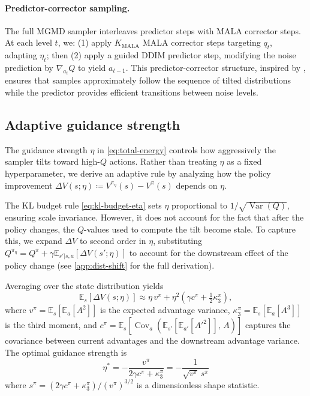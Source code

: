 \documentclass{article}
\theoremstyle{plain}
\theoremstyle{definition}
\theoremstyle{remark}
\newcommand{\E}{\mathbb{E}}
\DeclareMathOperator{\Var}{Var}
\DeclareMathOperator{\Cov}{Cov}
\begin{document}
\paragraph{Predictor-corrector sampling.}
The full MGMD sampler interleaves predictor steps with MALA corrector steps.
At each level $t$, we: (1) apply $K_{\text{MALA}}$ MALA corrector steps targeting $q_t$, adapting $\eta_t$; then (2) apply a guided DDIM predictor step, modifying the noise prediction by $\nabla_{a_t} Q$ to yield $a_{t-1}$.
This predictor-corrector structure, inspired by \citet{du2023reduce_reuse_recycle}, ensures that samples approximately follow the sequence of tilted distributions while the predictor provides efficient transitions between noise levels.

\subsection{Adaptive guidance strength}
\label{sec:adaptive-eta}

The guidance strength $\eta$ in \cref{eq:total-energy} controls how aggressively the sampler tilts toward high-$Q$ actions.
Rather than treating $\eta$ as a fixed hyperparameter, we derive an adaptive rule by analyzing how the policy improvement $\Delta V(s;\eta) \coloneqq V^{\pi_\eta}(s) - V^\pi(s)$ depends on $\eta$.

The KL budget rule \cref{eq:kl-budget-eta} sets $\eta$ proportional to $1/\sqrt{\Var(Q)}$, ensuring scale invariance.
However, it does not account for the fact that after the policy changes, the $Q$-values used to compute the tilt become stale.
To capture this, we expand $\Delta V$ to second order in $\eta$, substituting $Q^{\pi_\eta} = Q^\pi + \gamma \E_{s'|s,a}[\Delta V(s';\eta)]$ to account for the downstream effect of the policy change (see \cref{app:dist-shift} for the full derivation).

Averaging over the state distribution yields
\begin{equation}
  \E_{s}[\Delta V(s;\eta)] \approx \eta\, v^\pi + \eta^2\!\left(\gamma c^\pi + \tfrac{1}{2}\kappa_3^\pi\right),
  \label{eq:delta-v-expansion}
\end{equation}
where $v^\pi = \E_s[\E_a[A^2]]$ is the expected advantage variance, $\kappa_3^\pi = \E_s[\E_a[A^3]]$ is the third moment, and $c^\pi = \E_s[\Cov_a(\E_{s'}[\E_{a'}[A'^2]],\, A)]$ captures the covariance between current advantages and the downstream advantage variance.
The optimal guidance strength is
\begin{equation}
  \boxed{\;\eta^* = -\frac{v^\pi}{2\gamma c^\pi + \kappa_3^\pi} = -\frac{1}{\sqrt{v^\pi}\, s^\pi}\;}
  \label{eq:eta-star}
\end{equation}
where $s^\pi = (2\gamma c^\pi + \kappa_3^\pi) / (v^\pi)^{3/2}$ is a dimensionless shape statistic.
\end{document}
